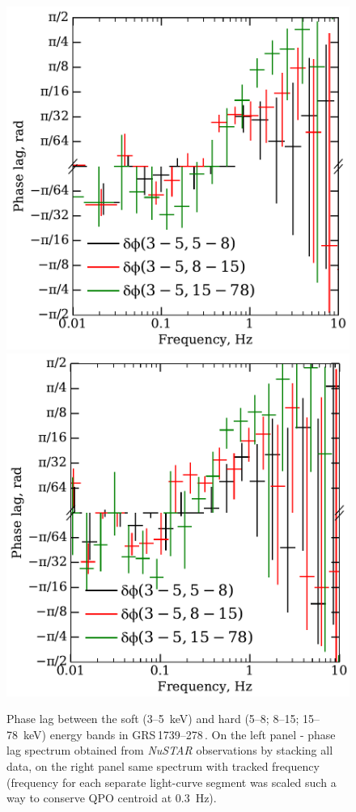 \documentclass[a4paper,fleqn,usenatbib]{mnras}
\def\grs{{GRS\,1739--278\,}}
\begin{document}
\begin{figure}
        \includegraphics[width=0.99\columnwidth]{phase_lag_untracked_2.pdf}
        \includegraphics[width=0.99\columnwidth]{phase_lag_new.pdf}
        \caption{Phase lag between the soft (3--5~keV) and hard (5--8; 8--15; 15--78~keV) energy bands in \grs. 
        On the left panel - phase lag spectrum obtained from {\it NuSTAR} observations by stacking all data, on the right panel same spectrum with tracked frequency (frequency for each separate light-curve segment was scaled such a way to conserve QPO centroid at 0.3~Hz).}
        \label{fig:phase_lag}
\end{figure}
\end{document}
